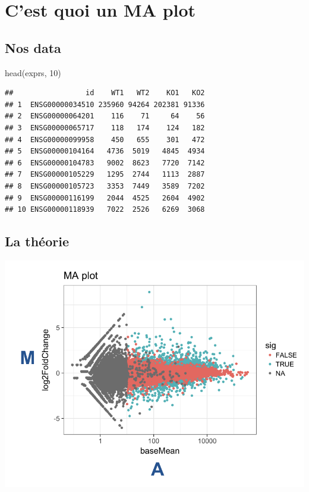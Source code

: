 \documentclass[
]{book}
\newenvironment{Shaded}{\begin{snugshade}}{\end{snugshade}}
\newcommand{\DecValTok}[1]{\textcolor[rgb]{0.00,0.00,0.81}{#1}}
\newcommand{\FunctionTok}[1]{\textcolor[rgb]{0.00,0.00,0.00}{#1}}
\newcommand{\NormalTok}[1]{#1}
\begin{document}
\hypertarget{cest-quoi-un-ma-plot}{%
\section{C'est quoi un MA plot}\label{cest-quoi-un-ma-plot}}

\hypertarget{nos-data}{%
\subsection{Nos data}\label{nos-data}}

\begin{Shaded}
\begin{Highlighting}[]
\FunctionTok{head}\NormalTok{(exprs, }\DecValTok{10}\NormalTok{)}
\end{Highlighting}
\end{Shaded}

\begin{verbatim}
##                 id    WT1   WT2    KO1   KO2
## 1  ENSG00000034510 235960 94264 202381 91336
## 2  ENSG00000064201    116    71     64    56
## 3  ENSG00000065717    118   174    124   182
## 4  ENSG00000099958    450   655    301   472
## 5  ENSG00000104164   4736  5019   4845  4934
## 6  ENSG00000104783   9002  8623   7720  7142
## 7  ENSG00000105229   1295  2744   1113  2887
## 8  ENSG00000105723   3353  7449   3589  7202
## 9  ENSG00000116199   2044  4525   2604  4902
## 10 ENSG00000118939   7022  2526   6269  3068
\end{verbatim}

\hypertarget{la-thuxe9orie}{%
\subsection{La théorie}\label{la-thuxe9orie}}

\includegraphics{images/MAplot.png}
\end{document}
